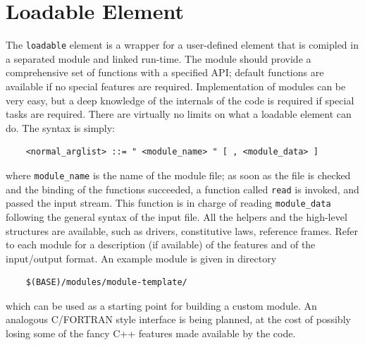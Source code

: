 \documentclass[10pt,dvips]{report}
\begin{document}
\section{Loadable Element}
The {\tt loadable} element is a wrapper for a user-defined element that is
comipled in a separated module and linked run-time.
The module should provide a comprehensive set of functions with a specified
API; default functions are available if no special features are required.
Implementation of modules can be very easy, but a deep knowledge of the
internals of the code is required if special tasks are required. 
There are virtually no limits on what a loadable element can do.
The syntax is simply:
\begin{verbatim}
    <normal_arglist> ::= " <module_name> " [ , <module_data> ]
\end{verbatim}
where {\tt module\_name} is the name of the module file; as soon as the file
is checked and the binding of the functions succeeded, a function called
{\tt read} is invoked, and passed the input stream.
This function is in charge of reading {\tt module\_data} following the
general syntax of the input file.
All the helpers and the high-level structures are available, such as
drivers, constitutive laws, reference frames.
Refer to each module for a description (if available) of the features and of
the input/output format.
An example module is given in directory
\begin{verbatim}
    $(BASE)/modules/module-template/
\end{verbatim}
which can be used as a starting point for building a custom module.
An analogous C/FORTRAN style interface is being planned, at the cost of
possibly losing some of the fancy C++ features made available by the code.
\end{document}
